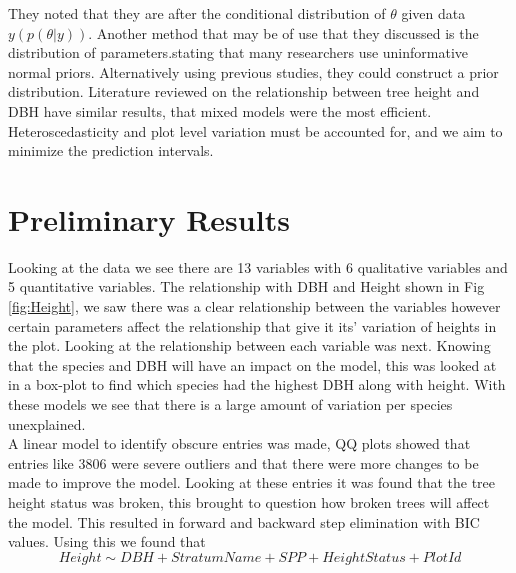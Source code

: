 \documentclass[a4paper,11pt,twoside]{report}
\begin{document}
They noted that they are after the conditional distribution of $\theta$ given data $y(p(\theta|y))$. Another method that may be of use that they discussed is the distribution of parameters.stating that many researchers use uninformative normal priors. Alternatively using previous studies, they could construct a prior distribution.
Literature reviewed on the relationship between tree height and DBH have similar results, that mixed models were the most efficient. Heteroscedasticity and plot level variation must be accounted for, and we aim to minimize the prediction intervals.

\chapter{Preliminary Results} 

Looking at the data we see there are 13 variables with 6 qualitative variables and 5 quantitative variables.
The relationship with DBH and Height shown in Fig \ref{fig:Height}, we saw there was a clear relationship between the variables however certain parameters affect the relationship that give it its' variation of heights in the plot.
Looking at the relationship between each variable was next. Knowing that the species and DBH will have an impact on the model, this was looked at in a box-plot to find which species had the highest DBH along with height. With these models we see that there is a large amount of variation per species unexplained.\\
A linear model to identify obscure entries was made, QQ plots showed that entries like 3806 were severe outliers and that there were more changes to be made to improve the model.
Looking at these entries it was found that the tree height status was broken, this brought to question how broken trees will affect the model. This resulted in forward and backward step elimination with BIC values. Using this we found that \\ 

\begin{equation}
      Height \sim DBH + StratumName + SPP + HeightStatus + PlotId
    \end{equation}
    
\end{document}

